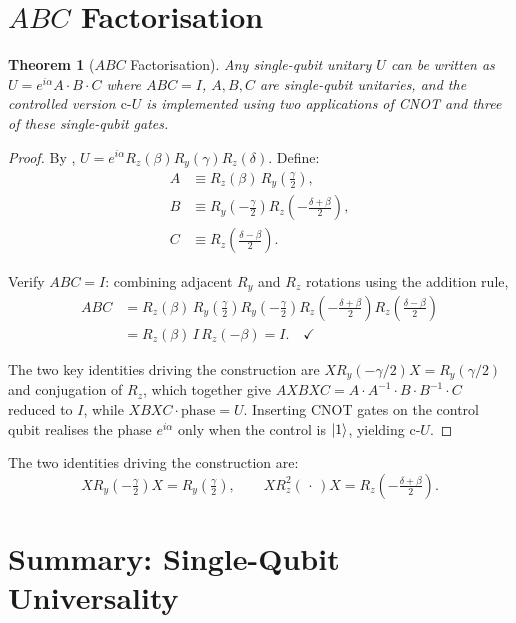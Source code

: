 \documentclass[12pt, a4paper, oneside]{report}
\theoremstyle{plain}
\newtheorem{theorem}{Theorem}[chapter]
\theoremstyle{definition}
\theoremstyle{remark}
\newcommand{\cU}{\mathrm{c}\text{-}U}
\newcommand{\Ry}{R_y}
\newcommand{\Rz}{R_z}
\begin{document}
\section{\texorpdfstring{$ABC$}{ABC} Factorisation}

\begin{theorem}[$ABC$ Factorisation]
\label{thm:abc}
Any single-qubit unitary $U$ can be written as $U = e^{i\alpha} A \cdot B \cdot C$ where
$ABC = I$, $A, B, C$ are single-qubit unitaries, and the controlled version $\cU$ is
implemented using two applications of CNOT and three of these single-qubit gates.
\end{theorem}

\begin{proof}
By , $U = e^{i\alpha}\Rz(\beta)\Ry(\gamma)\Rz(\delta)$. Define:
\begin{align}
  A &\equiv \Rz(\beta)\,\Ry\!\left(\tfrac{\gamma}{2}\right), \\
  B &\equiv \Ry\!\left(-\tfrac{\gamma}{2}\right)\Rz\!\left(-\tfrac{\delta+\beta}{2}\right), \\
  C &\equiv \Rz\!\left(\tfrac{\delta-\beta}{2}\right).
\end{align}

Verify $ABC = I$: combining adjacent $\Ry$ and $\Rz$ rotations using the addition rule,
\begin{align*}
  ABC &= \Rz(\beta)\,\Ry\!\left(\tfrac{\gamma}{2}\right)
          \Ry\!\left(-\tfrac{\gamma}{2}\right)\Rz\!\left(-\tfrac{\delta+\beta}{2}\right)
          \Rz\!\left(\tfrac{\delta-\beta}{2}\right) \\
      &= \Rz(\beta)\, I \,\Rz(-\beta) = I. \quad\checkmark
\end{align*}

The two key identities driving the construction are $X\Ry(-\gamma/2)X = \Ry(\gamma/2)$ and
conjugation of $\Rz$, which together give $AXBXC = A\cdot A^{-1}\cdot B \cdot B^{-1} \cdot C$
reduced to $I$, while $XBXC\cdot\text{phase} = U$. Inserting CNOT gates on the control qubit
realises the phase $e^{i\alpha}$ only when the control is $\ket{1}$, yielding $\cU$.
\end{proof}

The two identities driving the construction are:
\[
  X\Ry\!\left(-\tfrac{\gamma}{2}\right)X = \Ry\!\left(\tfrac{\gamma}{2}\right), \qquad
  X\Rz^2(\,\cdot\,)X = \Rz\!\left(-\tfrac{\delta+\beta}{2}\right).
\]

\section{Summary: Single-Qubit Universality}
\end{document}
